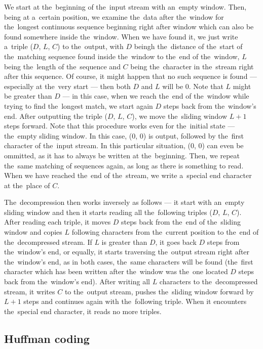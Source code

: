 We start at the~beginning of the~input stream with an~empty window. Then, being at a~certain position, we examine the~data after the~window for the~longest continuous sequence beginning right after window which can also be found somewhere inside the~window. When we have found it, we just write a~triple ($D$, $L$, $C$) to the~output, with $D$ beingh the~distance of the~start of the~matching sequence found inside the~window to the~end of the~window, $L$ being the~length of the~sequence and $C$ being the~character in the~stream right after this sequence. Of course, it might happen that no such sequence is found --- especially at the~very start --- then both $D$ and $L$ will be 0. Note that $L$ might be greater than $D$ --- in this case, when we reach the~end of the~window while trying to find the~longest match, we start again $D$ steps back from the~window's end. After outputting the triple ($D$, $L$, $C$), we move the~sliding window $L + 1$ steps forward. Note that this procedure works even for the~initial state --- the~empty sliding window. In this case, (0, 0) is output, followed by the~first character of the~input stream. In this particular situation, (0, 0) can even be ommitted, as it has to always be written at the~beginning. Then, we repeat the~same matching of sequences again, as long as there is something to read. When we have reached the~end of the~stream, we write a~special end character at the~place of $C$.

The~decompression then works inversely as follows --- it start with an~empty sliding window and then it starts reading all the~following triples ($D$, $L$, $C$). After reading each triple, it moves $D$ steps back from the~end of the~sliding window and copies $L$ following characters from the~current position to the~end of the~decompressed stream. If $L$ is greater than $D$, it goes back $D$ steps from the~window's end, or equally, it starts traversing the~output stream right after the~window's end, as in both cases, the~same characters will be found (the~first character which has been written after the~window was the~one located $D$ steps back from the~window's end). After writing all $L$ characters to the~decompressed stream, it writes $C$ to the~output stream, pushes the~sliding window forward by $L + 1$ steps and continues again with the~following triple. When it encounters the~special end character, it reads no more triples.

\subsection*{Huffman coding}\label{subsec:huffman}

